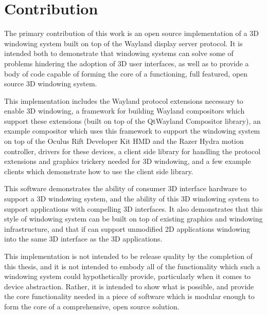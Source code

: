 \chapter{Contribution}
The primary contribution of this work is an open source implementation of a 3D windowing system built on top of the Wayland display server protocol. It is intended both to demonstrate that windowing systems can solve some of problems hindering the adoption of 3D user interfaces, as well as to provide a body of code capable of forming the core of a functioning, full featured, open source 3D windowing system. 
	
This implementation includes the Wayland protocol extensions necessary to enable 3D windowing, a framework for building Wayland compositors which support these extensions (built on top of the QtWayland Compositor library), an example compositor which uses this framework to support the windowing system on top of the Oculus Rift Developer Kit HMD and the Razer Hydra motion controller, drivers for these devices, a client side library for handling the protocol extensions and graphics trickery needed for 3D windowing, and a few example clients which  demonstrate how to use the client side library. 

This software demonstrates the ability of consumer 3D interface hardware to support a 3D windowing system, and the ability of this 3D windowing system to support applications with compelling 3D interfaces. It also demonstrates that this style of windowing system can be built on top of existing graphics and windowing infrastructure, and that if can support unmodified 2D applications windowing into the same 3D interface as the 3D applications. 

This implementation is not intended to be release quality by the completion of this thesis, and it is not intended to embody all of the functionality which such a windowing system could hypothetically provide, particularly when it comes to device abstraction. Rather, it is intended to show what is possible, and provide the core functionality needed in a piece of software which is modular enough to form the core of a comprehensive, open source solution. 
